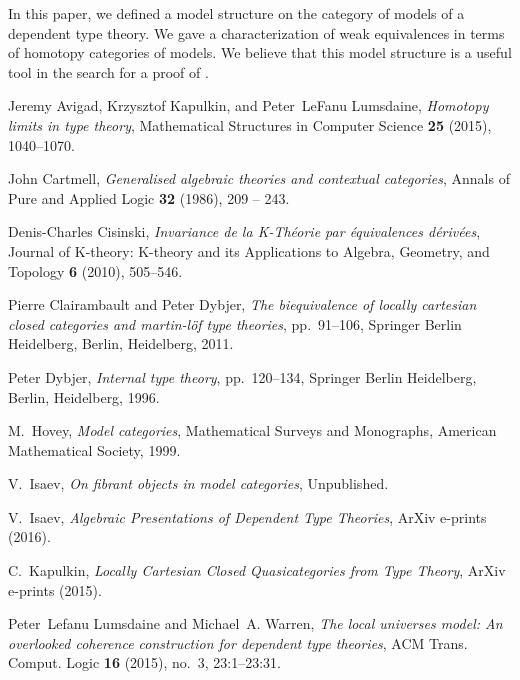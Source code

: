\documentclass{mscs}
\numberwithin{figure}{section}
\begin{document}
In this paper, we defined a model structure on the category of models of a dependent type theory.
We gave a characterization of weak equivalences in terms of homotopy categories of models.
We believe that this model structure is a useful tool in the search for a proof of .

\begin{thebibliography}{}
Jeremy Avigad, Krzysztof Kapulkin, and Peter~LeFanu Lumsdaine, \emph{Homotopy
  limits in type theory}, Mathematical Structures in Computer Science
  \textbf{25} (2015), 1040--1070.

John Cartmell, \emph{Generalised algebraic theories and contextual categories},
  Annals of Pure and Applied Logic \textbf{32} (1986), 209 -- 243.

Denis-Charles Cisinski, \emph{Invariance de la {K-Th\'eorie} par \'equivalences
  d\'eriv\'ees}, Journal of K-theory: K-theory and its Applications to Algebra,
  Geometry, and Topology \textbf{6} (2010), 505--546.

Pierre Clairambault and Peter Dybjer, \emph{The biequivalence of locally
  cartesian closed categories and martin-l{\"o}f type theories}, pp.~91--106,
  Springer Berlin Heidelberg, Berlin, Heidelberg, 2011.

Peter Dybjer, \emph{Internal type theory}, pp.~120--134, Springer Berlin
  Heidelberg, Berlin, Heidelberg, 1996.

M.~Hovey, \emph{Model categories}, Mathematical Surveys and Monographs,
  American Mathematical Society, 1999.

V.~{Isaev}, \emph{On fibrant objects in model categories}, Unpublished.

V.~{Isaev}, \emph{{Algebraic Presentations of Dependent Type Theories}}, ArXiv
  e-prints (2016).

C.~{Kapulkin}, \emph{{Locally Cartesian Closed Quasicategories from Type
  Theory}}, ArXiv e-prints (2015).

Peter~Lefanu Lumsdaine and Michael~A. Warren, \emph{The local universes model:
  An overlooked coherence construction for dependent type theories}, ACM Trans.
  Comput. Logic \textbf{16} (2015), no.~3, 23:1--23:31.


\end{thebibliography}
\end{document}
